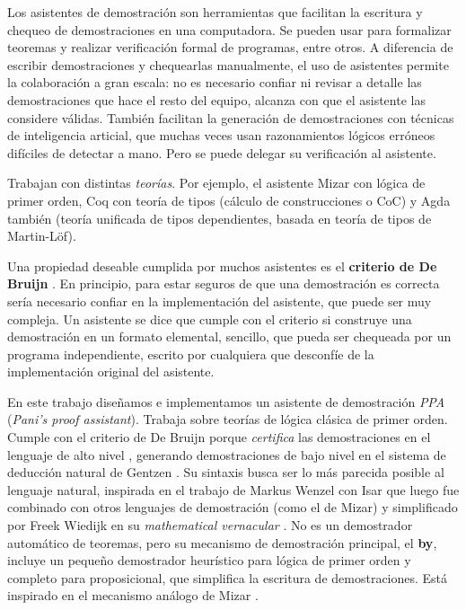 Los asistentes de demostración son herramientas que facilitan la escritura y chequeo de demostraciones en una computadora. Se pueden usar para formalizar teoremas y realizar verificación formal de programas, entre otros. A diferencia de escribir demostraciones y chequearlas manualmente, el uso de asistentes permite la colaboración a gran escala: no es necesario confiar ni revisar a detalle las demostraciones que hace el resto del equipo, alcanza con que el asistente las considere válidas. También facilitan la generación de demostraciones con técnicas de inteligencia articial, que muchas veces usan razonamientos lógicos erróneos difíciles de detectar a mano. Pero se puede delegar su verificación al asistente.

Trabajan con distintas \textit{teorías}. Por ejemplo, el asistente Mizar \cite{mizar} con lógica de primer orden, Coq \cite{coq} con teoría de tipos (cálculo de construcciones o CoC) y Agda \cite{agda} también (teoría unificada de tipos dependientes, basada en teoría de tipos de Martin-Löf).

Una propiedad deseable cumplida por muchos asistentes es el \textbf{criterio de De Bruijn} \cite{freek-bruijn}. En principio, para estar seguros de que una demostración es correcta sería necesario confiar en la implementación del asistente, que puede ser muy compleja. Un asistente se dice que cumple con el criterio si construye una demostración en un formato elemental, sencillo, que pueda ser chequeada por un programa independiente, escrito por cualquiera que desconfíe de la implementación original del asistente.

En este trabajo diseñamos e implementamos un asistente de demostración \textit{PPA}
(\textit{Pani's proof assistant}). Trabaja sobre teorías de lógica clásica de
primer orden. Cumple con el criterio de De Bruijn porque \textit{certifica} las
demostraciones en el lenguaje de alto nivel \ppaLang{}, generando demostraciones
de bajo nivel en el sistema de deducción natural de Gentzen \cite{gentzen-1935}. Su sintaxis busca ser lo más parecida posible al lenguaje natural, inspirada en el trabajo de Markus Wenzel con Isar \cite{wenzel-isar} que luego fue combinado con otros lenguajes de demostración (como el de Mizar) y simplificado por Freek Wiedijk en su \textit{mathematical vernacular} \cite{freek-mv}. No es un demostrador automático de teoremas, pero su mecanismo de
demostración principal, el \textbf{by}, incluye un pequeño demostrador
heurístico para lógica de primer orden y completo para proposicional, que
simplifica la escritura de demostraciones. Está inspirado en el mecanismo análogo de Mizar \cite{freek-by}.


